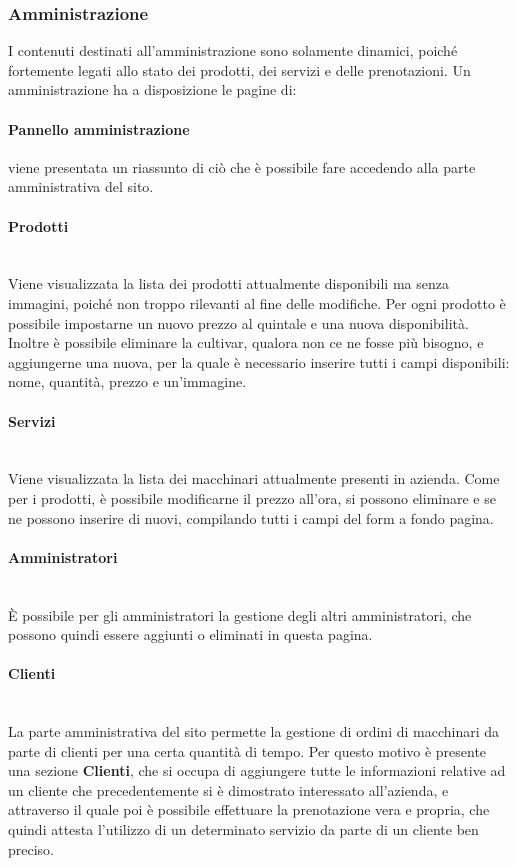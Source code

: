 \subsubsection{Amministrazione}
I contenuti destinati all'amministrazione sono solamente dinamici, poiché fortemente legati allo stato dei prodotti, dei servizi e delle prenotazioni. Un amministrazione ha a disposizione le pagine di:
\paragraph{Pannello amministrazione} viene presentata un riassunto di ciò che è possibile fare accedendo alla parte amministrativa del sito.
\paragraph{Prodotti}
~\\Viene visualizzata la lista dei prodotti attualmente disponibili ma senza immagini, poiché non troppo rilevanti al fine delle modifiche. Per ogni prodotto è possibile impostarne un nuovo prezzo al quintale e una nuova disponibilità. Inoltre è possibile eliminare la cultivar, qualora non ce ne fosse più bisogno, e aggiungerne una nuova, per la quale è necessario inserire tutti i campi disponibili: nome, quantità, prezzo e un'immagine.
\paragraph{Servizi}
~\\Viene visualizzata la lista dei macchinari attualmente presenti in azienda. Come per i prodotti, è possibile modificarne il prezzo all'ora, si possono eliminare e se ne possono inserire di nuovi, compilando tutti i campi del form a fondo pagina.
\paragraph{Amministratori}
~\\È possibile per gli amministratori la gestione degli altri amministratori, che possono quindi essere aggiunti o eliminati in questa pagina.
\paragraph{Clienti}
~\\La parte amministrativa del sito permette la gestione di ordini di macchinari da parte di clienti per una certa quantità di tempo. Per questo motivo è presente una sezione \textbf{Clienti}, che si occupa di aggiungere tutte le informazioni relative ad un cliente che precedentemente si è dimostrato interessato all'azienda, e attraverso il quale poi è possibile effettuare la prenotazione vera e propria, che quindi attesta l'utilizzo di un determinato servizio da parte di un cliente ben preciso.
